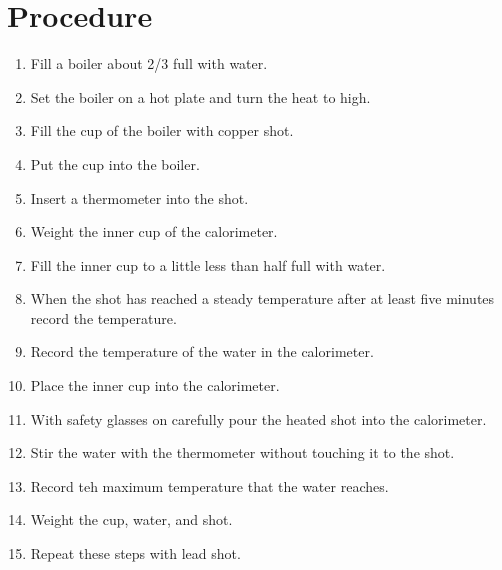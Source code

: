 \documentclass[12pt]{article}
\begin{document}
    \section*{Procedure}
        \begin{enumerate}
            \item Fill a boiler about 2/3 full with water.
            \item Set the boiler on a hot plate and turn the heat to high.
            \item Fill the cup of the boiler with copper shot.
            \item Put the cup into the boiler.
            \item Insert a thermometer into the shot.
            \item Weight the inner cup of the calorimeter.
            \item Fill the inner cup to a little less than half full with water.
            \item When the shot has reached a steady temperature after at least five minutes record the temperature.
            \item Record the temperature of the water in the calorimeter.
            \item Place the inner cup into the calorimeter.
            \item With safety glasses on carefully pour the heated shot into the calorimeter.
            \item Stir the water with the thermometer without touching it to the shot.
            \item Record teh maximum temperature that the water reaches.
            \item Weight the cup, water, and shot.
            \item Repeat these steps with lead shot.
        \end{enumerate}
\end{document}

